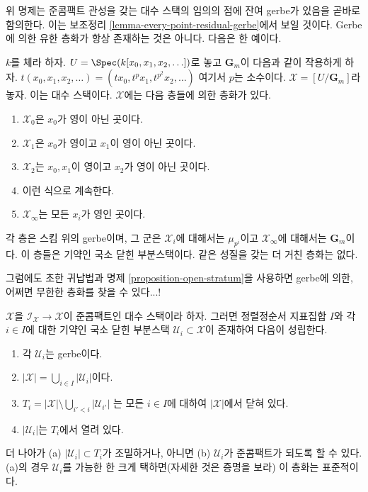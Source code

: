 \noindent
위 명제는 준콤팩트 관성을 갖는 대수 스택의 임의의 점에 잔여 gerbe가
있음을 곧바로 함의한다. 이는 보조정리
\ref{lemma-every-point-residual-gerbe}에서 보일 것이다. Gerbe에 의한 유한
층화가 항상 존재하는 것은 아니다. 다음은 한 예이다.

\begin{example}
\label{example-infinite-stratification}
$k$를 체라 하자. $U = \Spec(k[x_0, x_1, x_2, \ldots])$로 놓고
$\mathbf{G}_m$이 다음과 같이 작용하게 하자.
$t(x_0, x_1, x_2, \ldots) = (tx_0, t^p x_1, t^{p^2} x_2, \ldots)$
여기서 $p$는 소수이다. $\mathcal{X} = [U/\mathbf{G}_m]$라 놓자. 이는
대수 스택이다. $\mathcal{X}$에는 다음 층들에 의한 층화가 있다.
\begin{enumerate}
\item $\mathcal{X}_0$은 $x_0$가 영이 아닌 곳이다.
\item $\mathcal{X}_1$은 $x_0$가 영이고 $x_1$이 영이 아닌 곳이다.
\item $\mathcal{X}_2$는 $x_0, x_1$이 영이고 $x_2$가 영이 아닌 곳이다.
\item 이런 식으로 계속한다.
\item $\mathcal{X}_{\infty}$는 모든 $x_i$가 영인 곳이다.
\end{enumerate}
각 층은 스킴 위의 gerbe이며, 그 군은 $\mathcal{X}_i$에 대해서는
$\mu_{p^i}$이고 $\mathcal{X}_{\infty}$에 대해서는 $\mathbf{G}_m$이다.
이 층들은 기약인 국소 닫힌 부분스택이다. 같은 성질을 갖는 더 거친
층화는 없다.
\end{example}

\noindent
그럼에도 초한 귀납법과 명제 \ref{proposition-open-stratum}을 사용하면
gerbe에 의한, 어쩌면 무한한 층화를 찾을 수 있다...!%

\begin{lemma}
\label{lemma-every-point-in-a-stratum}
$\mathcal{X}$을 $\mathcal{I}_\mathcal{X} \to \mathcal{X}$이 준콤팩트인
대수 스택이라 하자. 그러면 정렬정순서 지표집합 $I$와 각 $i \in I$에
대한 기약인 국소 닫힌 부분스택
$\mathcal{U}_i \subset \mathcal{X}$이 존재하여 다음이 성립한다.
\begin{enumerate}
\item 각 $\mathcal{U}_i$는 gerbe이다.
\item $|\mathcal{X}| = \bigcup_{i \in I} |\mathcal{U}_i|$이다.
\item $T_i = |\mathcal{X}| \setminus \bigcup_{i' < i} |\mathcal{U}_{i'}|$
는 모든 $i \in I$에 대하여 $|\mathcal{X}|$에서 닫혀 있다.
\item $|\mathcal{U}_i|$는 $T_i$에서 열려 있다.
\end{enumerate}
더 나아가 (a) $|\mathcal{U}_i| \subset T_i$가 조밀하거나, 아니면
(b) $\mathcal{U}_i$가 준콤팩트가 되도록 할 수 있다. (a)의 경우
$\mathcal{U}_i$를 가능한 한 크게 택하면(자세한 것은 증명을 보라) 이
층화는 표준적이다.
\end{lemma}

